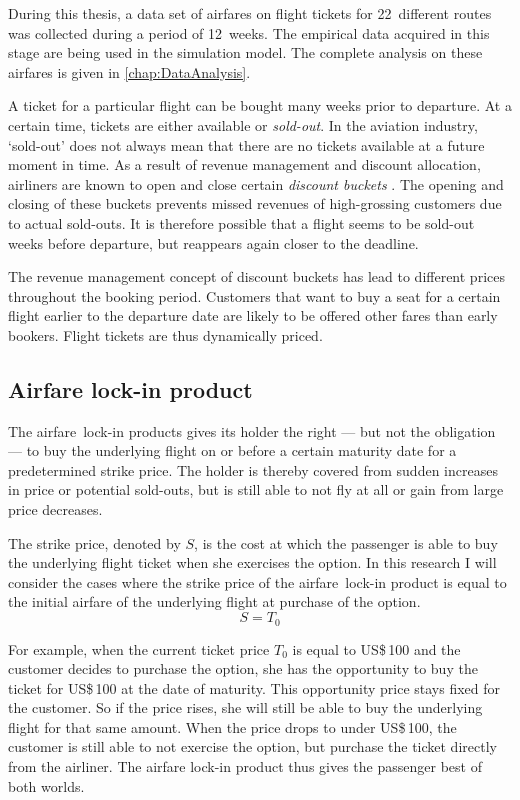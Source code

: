 During this thesis, a data set of airfares on flight tickets for 22~different routes was collected during a period of 12~weeks. The empirical data acquired in this stage are being used in the simulation model. The complete analysis on these airfares is given in \autoref{chap:DataAnalysis}.

A ticket for a particular flight can be bought many weeks prior to departure. At a certain time, tickets are either available or \emph{sold-out}. In the aviation industry, `sold-out' does not always mean that there are no tickets available at a future moment in time. As a result of revenue management and discount allocation, airliners are known to open and close certain \emph{discount buckets} \cite{mcgill1999revenue}. The opening and closing of these buckets prevents missed revenues of high-grossing customers due to actual sold-outs. It is therefore possible that a flight seems to be sold-out weeks before departure, but reappears again closer to the deadline.

The revenue management concept of discount buckets has lead to different prices throughout the booking period. Customers that want to buy a seat for a certain flight earlier to the departure date are likely to be offered other fares than early bookers. Flight tickets are thus dynamically priced.



\subsection{Airfare lock-in product}
The airfare~lock-in products gives its holder the right --- but not the obligation --- to buy the underlying flight on or before a certain maturity date for a predetermined strike price. The holder is thereby covered from sudden increases in price or potential sold-outs, but is still able to not fly at all or gain from large price decreases.

The strike price, denoted by $S$, is the cost at which the passenger is able to buy the underlying flight ticket when she exercises the option. In this research I will consider the cases where the strike price of the airfare~lock-in product is equal to the initial airfare of the underlying flight at purchase of the option.
$$S = T_0$$

For example, when the current ticket price $T_0$ is equal to US\$\,100 and the customer decides to purchase the option, she has the opportunity to buy the ticket for US\$\,100 at the date of maturity. This opportunity price stays fixed for the customer. So if the price rises, she will still be able to buy the underlying flight for that same amount. When the price drops to under US\$\,100, the customer is still able to not exercise the option, but purchase the ticket directly from the airliner. The airfare lock-in product thus gives the passenger best of both worlds.

